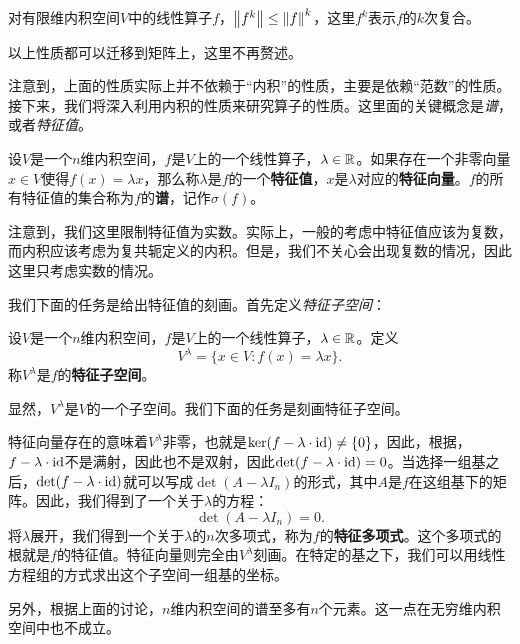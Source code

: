\begin{proposition}\label{prop:operator-power-norm-ineq}
    对有限维内积空间$V$中的线性算子$f$，$\left\|f^k\right\|\leq \left\|f\right\|^k$，这里$f^k$表示$f$的$k$次复合。
\end{proposition}

以上性质都可以迁移到矩阵上，这里不再赘述。

注意到，上面的性质实际上并不依赖于“内积”的性质，主要是依赖“范数”的性质。接下来，我们将深入利用内积的性质来研究算子的性质。这里面的关键概念是\emph{谱}，或者\emph{特征值}。

\begin{definition}
设$V$是一个$n$维内积空间，$f$是$V$上的一个线性算子，$\lambda\in\mathbb{R}$。如果存在一个非零向量$x\in V$使得$f(x)=\lambda x$，那么称$\lambda$是$f$的一个\textbf{特征值}，$x$是$\lambda$对应的\textbf{特征向量}。$f$的所有特征值的集合称为$f$的\textbf{谱}，记作$\sigma(f)$。
\end{definition}

注意到，我们这里限制特征值为实数。实际上，一般的考虑中特征值应该为复数，而内积应该考虑为复共轭定义的内积。但是，我们不关心会出现复数的情况，因此这里只考虑实数的情况。

我们下面的任务是给出特征值的刻画。首先定义\emph{特征子空间}：

\begin{definition}[特征子空间]
设$V$是一个$n$维内积空间，$f$是$V$上的一个线性算子，$\lambda\in\mathbb{R}$。定义
\[V^\lambda=\{x\in V:f(x)=\lambda x\}.\]
称$V^\lambda$是$f$的\textbf{特征子空间}。
\end{definition}
显然，$V^\lambda$是$V$的一个子空间。我们下面的任务是刻画特征子空间。

特征向量存在的意味着$V^\lambda$非零，也就是$\ker(f-\lambda\cdot \mathrm{id})\neq\{0\}$，因此，根据，$f-\lambda\cdot \mathrm{id}$不是满射，因此也不是双射，因此$\det(f-\lambda\cdot \mathrm{id})=0$。当选择一组基之后，$\det(f-\lambda\cdot \mathrm{id})$就可以写成$\det(A-\lambda I_n)$的形式，其中$A$是$f$在这组基下的矩阵。因此，我们得到了一个关于$\lambda$的方程：
\begin{equation}\label{eq:characteristic-equation}
    \det(A-\lambda I_n)=0.
\end{equation}
将$\lambda$展开，我们得到一个关于$\lambda$的$n$次多项式，称为$f$的\textbf{特征多项式}。这个多项式的根就是$f$的特征值。特征向量则完全由$V^\lambda$刻画。在特定的基之下，我们可以用线性方程组的方式求出这个子空间一组基的坐标。

另外，根据上面的讨论，$n$维内积空间的谱至多有$n$个元素。这一点在无穷维内积空间中也不成立。

